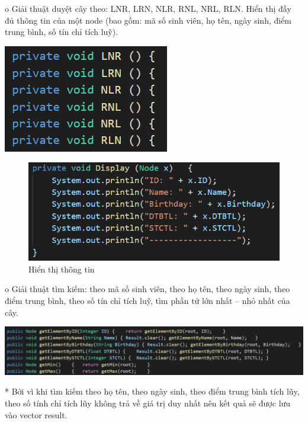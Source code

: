 \documentclass{report}
\begin{document}
o Giải thuật duyệt cây theo: LNR, LRN, NLR, RNL, NRL, RLN. Hiển thị đầy đủ thông tin của một node (bao gồm: mã số sinh viên, họ tên, ngày sinh, điểm trung bình, số tín chỉ tích luỹ).

    \begin{center}
     \includegraphics[scale=1.3]{e.png}
    \end{center}

\begin{center}
    \begin{figure}[htp]
    \begin{center}
     \includegraphics[scale=1]{f.png}
    \end{center}
    \caption{Hiển thị thông tin}
    \label{refhinh1}
    \end{figure}
\end{center}

\newpage
o Giải thuật tìm kiếm: theo mã số sinh viên, theo họ tên, theo ngày sinh, theo điểm trung bình, theo số tín chỉ tích luỹ, tìm phần tử lớn nhất – nhỏ nhất của cây.

    \begin{center}
     \includegraphics[scale=0.7]{g}
    \end{center}
* Bởi vì khi tìm kiếm theo họ tên, theo ngày sinh, theo điểm trung bình tích lũy, theo số tính chỉ tích lũy không trả về giá trị duy nhất nên kết quả sẽ được lưu vào vector result.
  
\end{document}
